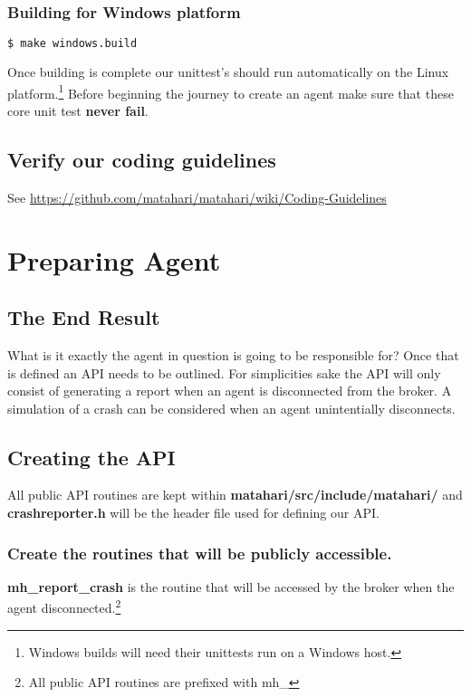 \documentclass[a4paper,12pt]{article}
\begin{document}
\subsubsection{Building for Windows platform}
\begin{lstlisting}[language=bash]
$ make windows.build
\end{lstlisting}

Once building is complete our unittest's should run 
automatically on the Linux platform.\footnote{Windows builds will need their unittests run on a Windows host.}
Before beginning the journey to create an agent make sure that these core unit test \textbf{never fail}.
\subsection{Verify our coding guidelines}
See \url{https://github.com/matahari/matahari/wiki/Coding-Guidelines}
\newpage
\section{Preparing Agent}
\subsection{The End Result}
What is it exactly the agent in question is going to be responsible for?
Once that is defined an API needs to be outlined. For simplicities sake 
the API will only consist of generating a report when an agent is disconnected 
from the broker. A simulation of a crash can be considered when an agent 
unintentially disconnects.

\subsection{Creating the API}
All public API routines are kept within \textbf{matahari/src/include/matahari/} and 
\textbf{crashreporter.h} will be the header file used for defining our API.

\subsubsection{Create the routines that will be publicly accessible.}



\textbf{mh\_report\_crash} is the routine that will be accessed by the broker when
the agent disconnected.\footnote{All public API routines are prefixed with mh\_}
\end{document}
